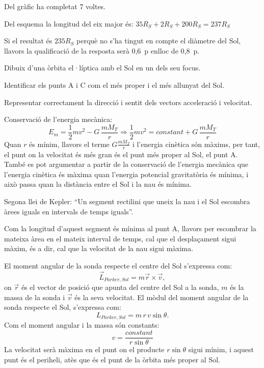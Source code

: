 \begin{solapartat}
Del gràfic ha completat 7 voltes.

Del esquema la longitud del eix major és: $35R_S + 2R_S + 200R_S = 237R_S$

Si el resultat és $235R_S$ perquè no s'ha tingut en compte el diàmetre del Sol, llavors la qualificació de la resposta serà 0,6~p enlloc de 0,8~p.

\end{solapartat}

\begin{solapartat}
Dibuix d'una òrbita el·líptica amb el Sol en un dels seu focus.

Identificar els punts A i C com el més proper i el més allunyat del Sol.

Representar correctament la direcció i sentit dels vectors acceleració i velocitat.

Conservació de l'energia mecànica:
\[ E_m = \frac{1}{2}mv^2 - G\,\frac{mM_T}{r} \Longrightarrow \frac{1}{2}mv^2 = \mathit{constant} + G\,\frac{mM_T}{r} \]
Quan $r$ és mínim, llavors el terme $G\frac{mM_T}{r}$ i l'energia cinètica són màxims, per tant, el punt on la velocitat és més gran és el punt més proper al Sol, el punt A. També es pot argumentar a partir de la conservació de l'energia mecànica que l'energia cinètica és màxima quan l'energia potencial gravitatòria és mínima, i això passa quan la distància entre el Sol i la nau és mínima.


Segona llei de Kepler: ``Un segment rectilini que uneix la nau i el Sol escombra àrees iguals en intervals de temps iguals''.

Com la longitud d'aquest segment és mínima al punt A, llavors per escombrar la mateixa àrea en el mateix interval de temps, cal que el desplaçament sigui màxim, és a dir, cal que la velocitat de la nau sigui màxima.

El moment angular de la sonda respecte el centre del Sol s'expressa com:
\[ \vec{L}_{Parker,Sol} = m\vec{r}\times\vec{v}, \]
on $\vec{r}$ és el vector de posició que apunta del centre del Sol a la sonda, $m$ és la massa de la sonda i $\vec{v}$ és la seva velocitat. El mòdul del moment angular de la sonda respecte el Sol, s'expressa com:
\[ L_{Parker,Sol} = m\,r\,v\sin\theta. \]
Com el moment angular i la massa són constants:
\[ v = \frac{\mathit{constant}}{r\sin\theta} \]
La velocitat serà màxima en el punt on el producte $r\sin\theta$ sigui mínim, i aquest punt és el periheli, atès que és el punt de la òrbita més proper al Sol.
\end{solapartat}
